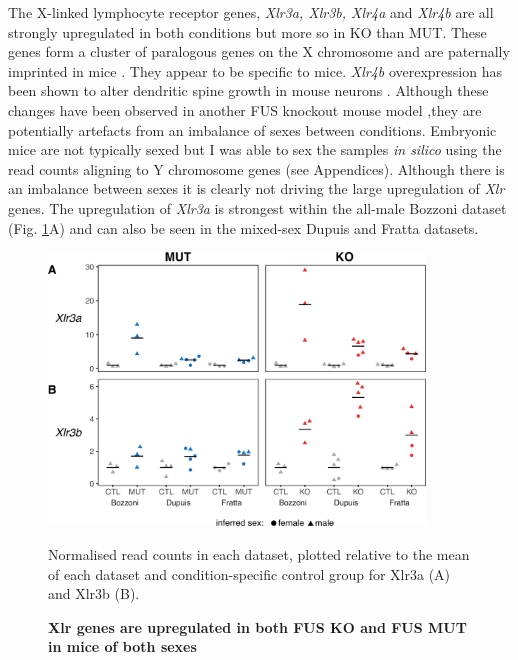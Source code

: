 The X-linked lymphocyte receptor genes, \textit{Xlr3a, Xlr3b, Xlr4a} and \textit{Xlr4b} are all strongly upregulated in both conditions but more so in KO than MUT. 
These genes form a cluster of paralogous genes on the X chromosome and are paternally imprinted in mice \citep{Raefski2005}.
They appear to be specific to mice.
\textit{Xlr4b} overexpression has been shown to alter dendritic spine growth in mouse neurons \citep{Cubelos2010}. 
Although these changes have been observed in another FUS knockout mouse model \citep{Kino2015},they are potentially artefacts from an imbalance of sexes between conditions. 
Embryonic mice are not typically sexed but I was able to sex the samples \textit{in silico} using the read counts aligning to Y chromosome genes (see Appendices). 
Although there is an imbalance between sexes it is clearly not driving the large upregulation of \textit{Xlr} genes. 
The upregulation of \textit{Xlr3a} is strongest within the all-male Bozzoni dataset (Fig. \ref{fig:fus_xlr_expression}A) and can also be seen in the mixed-sex Dupuis and Fratta datasets. 

\begin{figure}[ht!]
	\centering
	\includegraphics[width=10cm]{Figures/06_fus_meta/xlr_sex_expression.png}
	\caption{\textbf{Xlr genes are upregulated in both FUS KO and FUS MUT in mice of both sexes} }	
    Normalised read counts in each dataset, plotted relative to the mean of each dataset and condition-specific control group for Xlr3a (A) and Xlr3b (B). 
	\label{fig:fus_xlr_expression}
\end{figure}



